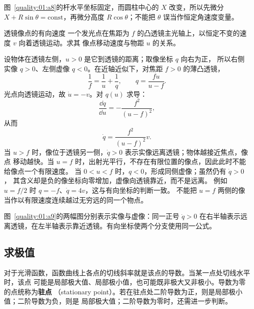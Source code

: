{\begin{xesolution}
图~\ref{quality:01:a8}的杆水平坐标固定，而圆柱中心的 $X$ 改变，所以先微分 $X+R\sin\theta=\mathrm{const}$，再微分高度 $R\cos\theta$；不能把 $\theta$ 误当作恒定角速度变量。
\end{xesolution}

\begin{origexamplebox}{透镜像点的有向速度}\label{ch01:ex:s14-1-5}
一个发光点在焦距为 $f$ 的凸透镜主光轴上，以恒定不变的速度 $v$ 向着透镜运动。求其
像点移动速度与物距 $u$ 的关系。

\end{origexamplebox}

\begin{xesolution}
设物体在透镜左侧，$u>0$ 是它到透镜的距离；取像坐标 $q$ 向右为正，
所以右侧实像 $q>0$、左侧虚像 $q<0$。在近轴近似下，对焦距 $f>0$ 的薄凸透镜，
\[
 \frac1f=\frac1u+\frac1q,\qquad q=\frac{fu}{u-f}.
\]
光点向透镜运动，故 $\dot u=-v$。对 $q(u)$ 求导：
\[
 \frac{\dd q}{\dd u}=-\frac{f^2}{(u-f)^2},
\]
从而
\[
 \boxed{\dot q=\frac{f^2}{(u-f)^2}v}.
\]
当 $u>f$ 时，像位于透镜另一侧，$\dot q>0$ 表示实像远离透镜；物体越接近焦点，像点
移动越快。当 $u=f$ 时，出射光平行，不存在有限位置的像点，因此此时不能给像点一个有限速度。
当 $0<u<f$ 时，$q<0$，形成同侧虚像；虽然仍有 $\dot q>0$，
其含义却是负的像坐标向零增加，虚像向透镜靠近，而不是远离。
例如 $u=f/2$ 时 $q=-f$、$\dot q=4v$，这与有向坐标的判断一致。
不能把 $u=f$ 两侧的像当作以有限速度连续越过无穷远的同一个物点。


图~\ref{quality:01:a9}的两幅图分别表示实像与虚像：同一正号 $\dot q>0$ 在右半轴表示远离透镜，在左半轴表示靠近透镜。有向坐标使两个分支使用同一公式。
\end{xesolution}

\subsection{求极值}

对于光滑函数，函数曲线上各点的切线斜率就是该点的导数。当某一点处切线水平时，该点
可能是局部极大值、局部极小值，也可能既非极大又非极小。导数为零的点统称为\textbf{驻点}
（stationary point）。若在驻点处二阶导数为正，则是局部极小值；二阶导数为负，则是
局部极大值；二阶导数为零时，还需进一步判断。

\extremaDiagram

}
